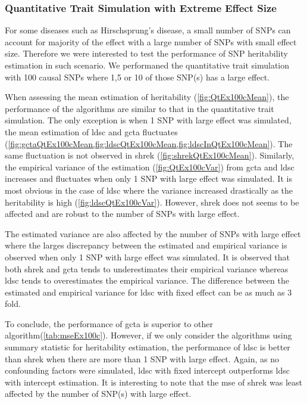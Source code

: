 \documentclass[12pt]{scrbook}
\begin{document}

\subsubsection{Quantitative Trait Simulation with Extreme Effect Size}

For some diseases such as Hirschsprung's disease, a small number of \glspl{SNP} can account for majority of the effect with a large number of \glspl{SNP} with small effect size. 
Therefore we were interested to test the performance of \gls{SNP} heritability estimation in such scenario.
We performaned the quantitative trait simulation with 100 causal \glspl{SNP} where 1,5 or 10 of those \gls{SNP}(s) has a large effect.

When assessing the mean estimation of heritability (\cref{fig:QtEx100cMean}), the performance of the algorithms are similar to that in the quantitative trait simulation.
The only exception is when 1 \gls{SNP} with large effect was simulated, the mean estimation of \gls{ldsc} and \gls{gcta} fluctuates (\cref{fig:gctaQtEx100cMean,fig:ldscQtEx100cMean,fig:ldscInQtEx100cMean}).
The same fluctuation is not observed in \gls{shrek} (\cref{fig:shrekQtEx100cMean}). 
Similarly, the empirical variance of the estimation (\cref{fig:QtEx100cVar}) from \gls{gcta} and \gls{ldsc} increases and fluctuates when only 1 \gls{SNP} with large effect was simulated.
It is most obvious in the case of \gls{ldsc} where the variance increased drastically as the heritability is high (\cref{fig:ldscQtEx100cVar}).
However, \gls{shrek} does not seems to be affected and are robust to the number of \glspl{SNP} with large effect. 

The estimated variance are also affected by the number of \glspl{SNP} with large effect where the larges discrepancy between the estimated and empirical variance is observed when only 1 \gls{SNP} with large effect was simulated. 
It is observed that both \gls{shrek} and \gls{gcta} tends to underestimates their empirical variance whereas \gls{ldsc} tends to overestimates the empirical variance. 
The difference between the estimated and empirical variance for \gls{ldsc} with fixed effect can be as much as 3 fold. 

To conclude, the performance of \gls{gcta} is superior to other algorithm(\cref{tab:mseEx100c}).
However, if we only consider the algorithms using summary statistic for heritability estimation, the performance of \gls{ldsc} is better than \gls{shrek} when there are more than 1 \gls{SNP} with large effect. 
Again, as no confounding factors were simulated, \gls{ldsc} with fixed intercept outperforms \gls{ldsc} with intercept estimation.
It is interesting to note that the \gls{mse} of \gls{shrek} was least affected by the number of \gls{SNP}(s) with large effect.
\end{document}
